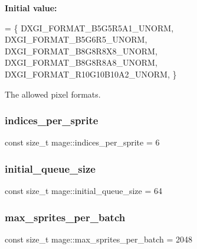 {\bfseries Initial value\+:}
\begin{DoxyCode}
= \{
        DXGI\_FORMAT\_B5G5R5A1\_UNORM,    
        DXGI\_FORMAT\_B5G6R5\_UNORM,      
        DXGI\_FORMAT\_B8G8R8X8\_UNORM,    
        DXGI\_FORMAT\_B8G8R8A8\_UNORM,    
        DXGI\_FORMAT\_R10G10B10A2\_UNORM, 
    \}
\end{DoxyCode}
The allowed pixel formats. \hypertarget{namespacemage_a06594a8c61d05e5884b56efd264cce1e}{}\label{namespacemage_a06594a8c61d05e5884b56efd264cce1e} 
\subsubsection{\texorpdfstring{indices\+\_\+per\+\_\+sprite}{indices\_per\_sprite}}
{\footnotesize\ttfamily const size\+\_\+t mage\+::indices\+\_\+per\+\_\+sprite = 6\hspace{0.3cm}{\ttfamily [static]}}

\hypertarget{namespacemage_a64d189167b7098c519fdcefbe4ac058f}{}\label{namespacemage_a64d189167b7098c519fdcefbe4ac058f} 
\subsubsection{\texorpdfstring{initial\+\_\+queue\+\_\+size}{initial\_queue\_size}}
{\footnotesize\ttfamily const size\+\_\+t mage\+::initial\+\_\+queue\+\_\+size = 64\hspace{0.3cm}{\ttfamily [static]}}

\hypertarget{namespacemage_adc9000a9470d1e75475b182bc5c5cde3}{}\label{namespacemage_adc9000a9470d1e75475b182bc5c5cde3} 
\subsubsection{\texorpdfstring{max\+\_\+sprites\+\_\+per\+\_\+batch}{max\_sprites\_per\_batch}}
{\footnotesize\ttfamily const size\+\_\+t mage\+::max\+\_\+sprites\+\_\+per\+\_\+batch = 2048\hspace{0.3cm}{\ttfamily [static]}}

